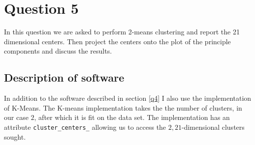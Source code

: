 \section{Question 5}
In this question we are asked to perform 2-means clustering and report the 21 dimensional centers. Then project the centers onto the plot of the principle components and discuss the results.
\subsection{Description of software}
In addition to the software described in section \ref{q4} I also use the \cite{scikit-learn} implementation of K-Means. The K-means implementation takes the the number of clusters, in our case \(2\), after which it is fit on the data set. The implementation has an attribute \texttt{cluster\_centers\_} allowing us to access the \(2, 21\)-dimensional clusters sought. 
